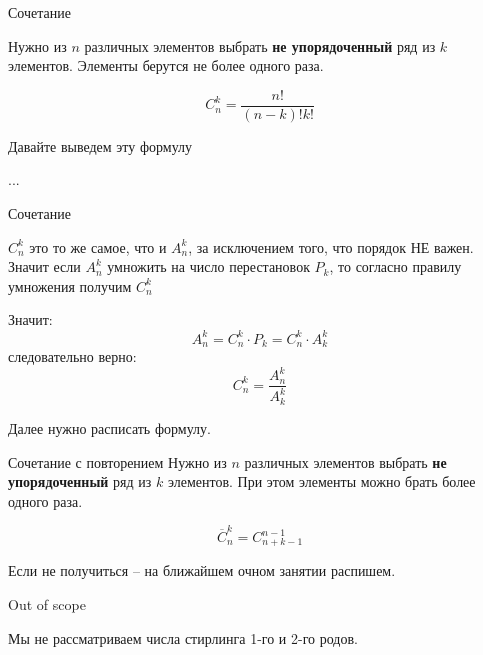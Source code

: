 \begin{frame}{Сочетание}
	
Нужно из
$n$
различных элементов 
выбрать \textbf{не упорядоченный}
ряд из $k$
элементов. 
Элементы берутся не более одного раза.

\begin{equation}
C_n^k = \frac{n!}{\left( n-k\right)! k!}
\end{equation}

Давайте выведем эту формулу

...
\end{frame}

\begin{frame}{Сочетание}

$C_n^k$ это то же самое, 
что и $A_n^k$, за исключением того, что порядок НЕ важен.
Значит если  $A_n^k$ умножить на число перестановок $P_k$,
то согласно правилу умножения получим $C_n^k$

Значит:
\begin{equation*}
A_n^k = C_n^k \cdot P_k = C_n^k \cdot A_k^k
\end{equation*}
следовательно верно:
\begin{equation*}
C_n^k = \frac{A_n^k}{A_k^k}
\end{equation*}

Далее нужно расписать формулу. 

\end{frame}

\begin{frame}{Сочетание с повторением}
Нужно из
$n$
различных элементов 
выбрать \textbf{не упорядоченный}
ряд из $k$
элементов.
При этом элементы можно брать более одного раза.

\begin{equation}
\overline{C}_n^k = C_{n+k-1}^{n-1}
\end{equation}

Если не получиться -- на ближайшем очном занятии распишем.
	
\end{frame}

\begin{frame}{Out of scope}
	
Мы не рассматриваем числа стирлинга 1-го и 2-го родов.

\end{frame}

